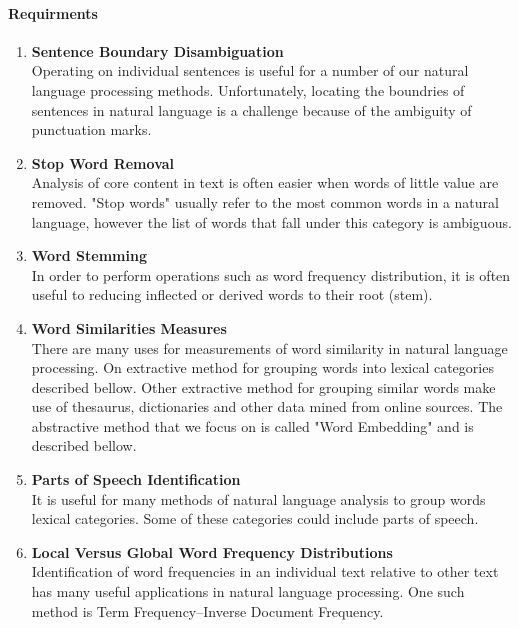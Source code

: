\documentclass[12pt]{article}
\begin{document}
\paragraph{Requirments}
\begin{enumerate}
	\item 
		\textbf{Sentence Boundary Disambiguation}\\
		Operating on individual sentences is useful for a number of our natural language processing methods. Unfortunately, locating the boundries of sentences in natural language is a challenge because of the ambiguity of punctuation marks. 
		
	\item 
		\textbf{Stop Word Removal}\\
		Analysis of core content in text is often easier when words of little value are removed. "Stop words" usually refer to the most common words in a natural language, however the list of words that fall under this category is ambiguous.

	\item 
		\textbf{Word Stemming}\\
		In order to perform operations such as word frequency distribution, it is often useful to reducing inflected or derived words to their root (stem).
		
	\item 
		\textbf{Word Similarities Measures}\\
		There are many uses for measurements of word similarity in natural language processing. On extractive method for grouping words into lexical categories described bellow. Other extractive method for grouping similar words make use of thesaurus, dictionaries and other data mined from online sources. The abstractive method that we focus on is called "Word Embedding" and is described bellow.
		
	\item 
		\textbf{Parts of Speech Identification}\\
		It is useful for many methods of natural language analysis to group words lexical categories. Some of these categories could include parts of speech.


	\item 
		\textbf{Local Versus Global Word Frequency Distributions}\\
		Identification of word frequencies in an individual text relative to other text has many useful applications in natural language processing. One such method is Term Frequency–Inverse Document Frequency.
		


\end{enumerate}
\end{document}
